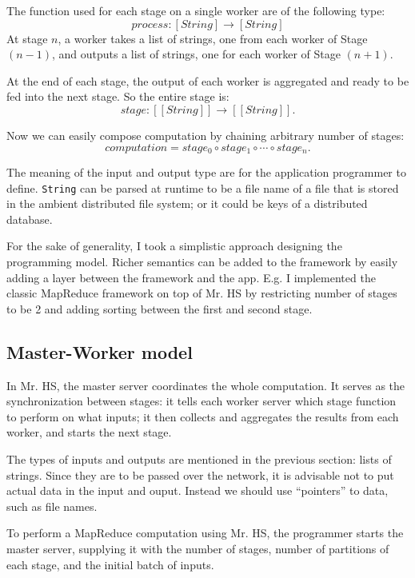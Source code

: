 \documentclass[a4paper]{article}
\begin{document}
The function used 
for each stage on a single worker are of the following type:
\[
process : [String] \rightarrow [String]
\]
At stage $n$, a worker takes a list of 
strings, one from each worker of Stage $(n-1)$,
and outputs a list of strings, one for each 
worker of Stage $(n+1)$.

At the end of each stage, 
the output of each worker is aggregated 
and ready to be fed into the next stage.
So the entire stage is:
\[
stage : [[String]] \rightarrow [[String]].
\]

Now we can easily compose computation by
chaining arbitrary number of stages: 
\[
computation = stage_0 \circ stage_1 \circ \cdots \circ stage_n.
\]

The meaning of the input and output type 
are for the application programmer to define. 
\texttt{String} can be parsed at runtime to 
be a file name of a file that is stored in the ambient distributed
file system; or it could be keys of a distributed database.

For the sake of generality, I took a simplistic approach 
designing the programming model. Richer semantics
can be added to the framework by easily adding a layer 
between the framework and the app. E.g.
I implemented the classic MapReduce framework on top 
of Mr. HS by restricting number of stages to be 2 and 
adding sorting between the first and second stage.

\subsection{Master-Worker model}
In Mr. HS, the master server coordinates the whole computation.
It serves as the synchronization between stages:
it tells each worker server which stage function to 
perform on what inputs; it then collects and aggregates the results
from each worker, and starts the next stage.

The types of inputs and outputs are mentioned in the previous section:
lists of strings. 
Since they are to be passed over the network,
it is advisable not to put actual data 
in the input and ouput. Instead we should use ``pointers'' to data, such as file names.

To perform a MapReduce computation using Mr. HS, the programmer starts the master server, supplying 
it with the number of stages, number of partitions of each stage, and the initial batch of inputs.
\end{document}
